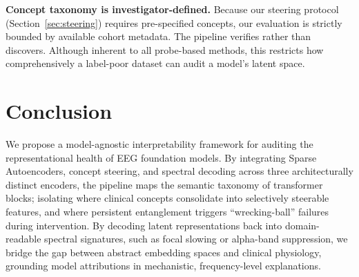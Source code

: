 \documentclass{article}
\begin{document}


\textbf{Concept taxonomy is investigator-defined.} 
Because our steering protocol (Section~\ref{sec:steering}) requires pre-specified concepts, our evaluation is strictly bounded by available cohort metadata. The pipeline verifies rather than discovers. Although inherent to all probe-based methods, this restricts how comprehensively a label-poor dataset can audit a model's latent space.
\section{Conclusion}
We propose a model-agnostic interpretability framework for auditing the representational health of EEG foundation models. By integrating Sparse Autoencoders, concept steering, and spectral decoding across three architecturally distinct encoders, the pipeline maps the semantic taxonomy of transformer blocks; isolating where clinical concepts consolidate into selectively steerable features, and where persistent entanglement triggers ``wrecking-ball'' failures during intervention. By decoding latent representations back into domain-readable spectral signatures, such as focal slowing or alpha-band suppression, we bridge the gap between abstract embedding spaces and clinical physiology, grounding model attributions in mechanistic, frequency-level explanations.
\end{document}
